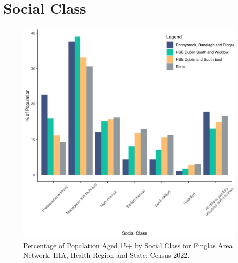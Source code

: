 \documentclass{article}
\begin{document}
\section{Social Class}\label{sect:SC}
\begin{figure}[H]
	\centering
	\includegraphics[width = 140mm]{../figures/SocialClassED.pdf}
	\caption{Percentage of Population Aged 15+ by Social Class for Finglas Area Network, IHA, Health Region and State; Census 2022.}
	\label{fig:vbnv}
	\end{figure}
\end{document}
